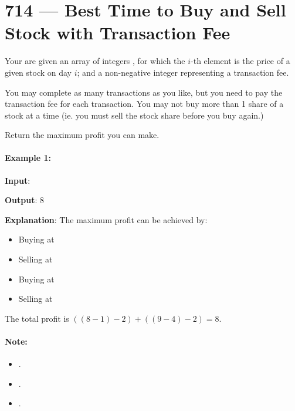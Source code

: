\section{714 --- Best Time to Buy and Sell Stock with Transaction Fee}
Your are given an array of integers , for which the $i$-th element is the price of a given stock on day $i$; and a non-negative integer  representing a transaction fee.

You may complete as many transactions as you like, but you need to pay the transaction fee for each transaction. You may not buy more than 1 share of a stock at a time (ie. you must sell the stock share before you buy again.)

Return the maximum profit you can make.

\paragraph{Example 1:}

\begin{flushleft}
\textbf{Input}: 

\textbf{Output}: 8

\textbf{Explanation}: The maximum profit can be achieved by:

\begin{itemize}
\item Buying at 

\item Selling at 

\item Buying at 

\item Selling at 
\end{itemize}

The total profit is $((8 - 1) - 2) + ((9 - 4) - 2) = 8$.

\end{flushleft}

\paragraph{Note:}

\begin{itemize}
\item {}.
\item {}.
\item {}.
\end{itemize}

